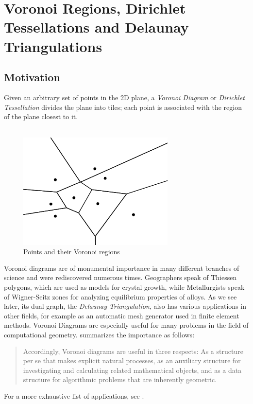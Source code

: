 \section[Voronoi and Delaunay]{Voronoi Regions, Dirichlet Tessellations and Delaunay Triangulations}
\subsection{Motivation}
Given an arbitrary set of points in the 2D plane, a \textit{Voronoi Diagram} or \textit{Dirichlet Tessellation} divides the plane into tiles; each point is associated with the region of the plane closest to it.\\~\\
\begin{figure}[H]
    \centering
    \includegraphics[width=0.7\textwidth]{voronoi.png}
    \caption{Points and their Voronoi regions}
    \label{fig:my_label}
\end{figure}
Voronoi diagrams are of monumental importance in many different branches of science and were rediscovered numerous times. Geographers speak of Thiessen polygons, which are used as models for crystal growth, while Metallurgists speak of Wigner-Seitz zones for analyzing equilibrium properties of alloys. As we see later, its dual graph, the \textit{Delaunay Triangulation}, also has various applications in other fields, for example as an automatic mesh generator used in finite element methods. Voronoi Diagrams are especially useful for many problems in the field of computational geometry.
\newpage
\cite{Aurenhammer1991} summarizes the importance as follows:
\begin{quote}
    Accordingly, Voronoi diagrams are useful in three respects: As a structure per se that makes explicit natural processes, as an auxiliary structure for investigating and calculating related mathematical objects, and as a data structure for algorithmic problems that are inherently geometric.
\end{quote}
For a more exhaustive list of applications, see \cite{Aurenhammer1991}.
